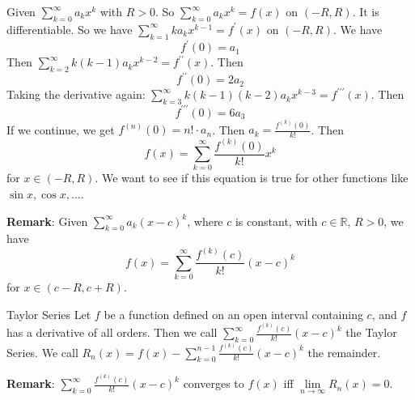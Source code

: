 \documentclass{report}
\begin{document}
Given $\sum_{k = 0}^{\infty} a_{k}x^{k}$ with $R > 0$. So $\sum_{k = 0}^{\infty} a_{k}x^{k} = f(x)$ on $(-R, R)$. It is differentiable. So we have $\sum_{k = 1}^{\infty} ka_{k}x^{k - 1} = f^{\prime}(x)$ on $(-R, R)$. We have
    \begin{equation*}
        f^{\prime}(0) = a_{1}
    \end{equation*}
Then $\sum_{k = 2}^{\infty} k(k - 1)a_{k}x^{k - 2} = f^{\prime\prime}(x)$. Then
    \begin{equation*}
        f^{\prime\prime}(0) = 2a_{2}
    \end{equation*}
Taking the derivative again: $\sum_{k = 3}^{\infty} k(k - 1)(k - 2)a_{k}x^{k - 3} = f^{\prime\prime\prime}(x)$. Then 
    \begin{equation*}
        f^{\prime\prime\prime}(0) = 6a_{3}
    \end{equation*}
If we continue, we get $f^{(n)}(0) = n! \cdot a_{n}$. Then $a_{k} = \frac{f^{(k)}(0)}{k!}$. Then
    \begin{equation*}
        f(x) = \sum_{k = 0}^{\infty}\dfrac{f^{(k)}(0)}{k!}x^{k}
    \end{equation*}
for $x \in (-R, R)$. We want to see if this equation is true for other functions like $\sin{x}, \cos{x}, \ldots$. 

\textbf{Remark}: Given $\sum_{k = 0}^{\infty} a_{k}(x - c)^{k}$, where $c$ is constant, with $c \in \mathbb{R}$, $R > 0$, we have
    \begin{equation*}
        f(x) = \sum_{k = 0}^{\infty}\dfrac{f^{(k)}(c)}{k!}(x - c)^{k}
    \end{equation*}
for $x \in (c - R, c + R)$.

\begin{definition}{Taylor Series}
    Let $f$ be a function defined on an open interval containing $c$, and $f$ has a derivative of all orders. Then we call $\sum_{k = 0}^{\infty}\frac{f^{(k)}(c)}{k!}(x - c)^{k}$ the Taylor Series. We call $R_{n}(x) = f(x) - \sum_{k = 0}^{n - 1}\frac{f^{(k)}(c)}{k!}(x - c)^{k}$ the remainder.
\end{definition}

\textbf{Remark}: $\sum_{k = 0}^{\infty}\frac{f^{(k)}(c)}{k!}(x - c)^{k}$ converges to $f(x)$ iff $\lim\limits_{n \to \infty}R_{n}(x) = 0$.
\end{document}
